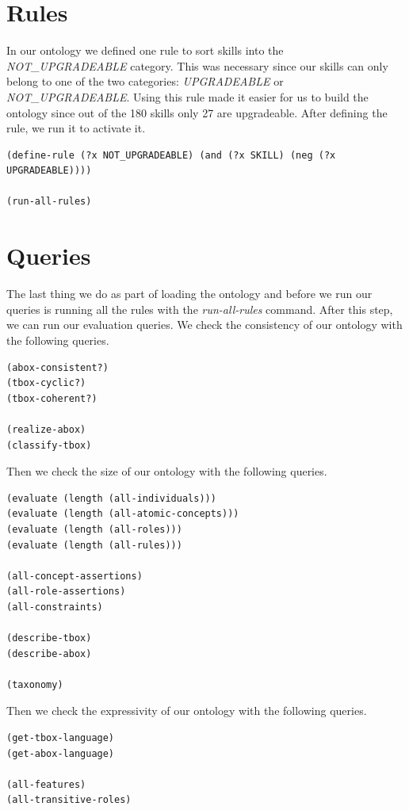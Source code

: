 \documentclass[a4paper,12pt]{report}
\begin{document}
\clearpage
\section{Rules}
In our ontology we defined one rule to sort skills into the \textit{NOT\_UPGRADEABLE} category. This was necessary since our skills can only belong to one of the two categories: \textit{UPGRADEABLE} or \textit{NOT\_UPGRADEABLE}. Using this rule made it easier for us to build the ontology since out of the 180 skills only 27 are upgradeable. After defining the rule, we run it to activate it.

\begin{lstlisting}
(define-rule (?x NOT_UPGRADEABLE) (and (?x SKILL) (neg (?x UPGRADEABLE))))

(run-all-rules)
\end{lstlisting}

\section{Queries}
The last thing we do as part of loading the ontology and before we run our queries is running all the rules with the \textit{run-all-rules} command. After this step, we can run our evaluation queries.
We check the consistency of our ontology with the following queries.

\begin{lstlisting}
(abox-consistent?)
(tbox-cyclic?)
(tbox-coherent?)

(realize-abox)
(classify-tbox)
\end{lstlisting}

Then we check the size of our ontology with the following queries.

\begin{lstlisting}
(evaluate (length (all-individuals)))
(evaluate (length (all-atomic-concepts)))
(evaluate (length (all-roles)))
(evaluate (length (all-rules)))

(all-concept-assertions)
(all-role-assertions)
(all-constraints)

(describe-tbox)
(describe-abox)

(taxonomy)
\end{lstlisting}

Then we check the expressivity of our ontology with the following queries.

\begin{lstlisting}
(get-tbox-language)
(get-abox-language)

(all-features)
(all-transitive-roles)
\end{lstlisting}
\end{document}
